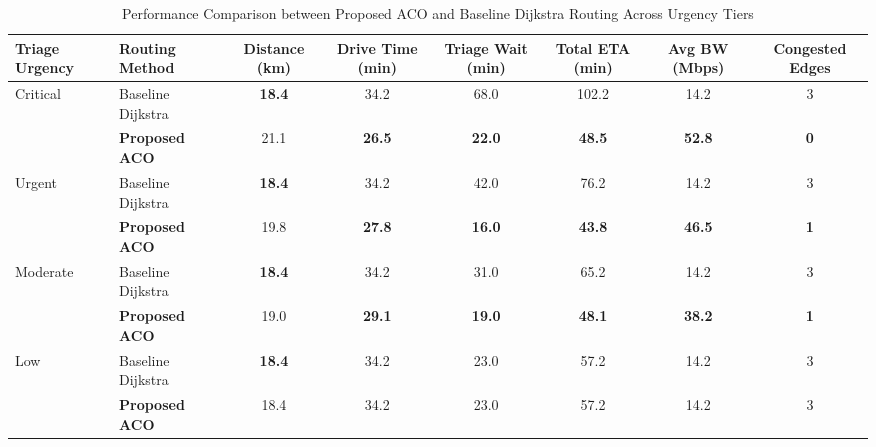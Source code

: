 \documentclass[conference]{IEEEtran}
\begin{document}
\begin{table}[t]
\caption{Performance Comparison between Proposed ACO and Baseline Dijkstra Routing Across Urgency Tiers}
\begin{center}
\begin{tabular}{llcccccc}
\toprule
\textbf{Triage Urgency} & \textbf{Routing Method} & \textbf{Distance (km)} & \textbf{Drive Time (min)} & \textbf{Triage Wait (min)} & \textbf{Total ETA (min)} & \textbf{Avg BW (Mbps)} & \textbf{Congested Edges} \\
\midrule
\multirow{2}{*}{Critical} & Baseline Dijkstra & \textbf{18.4} & 34.2 & 68.0 & 102.2 & 14.2 & 3 \\
                          & \textbf{Proposed ACO} & 21.1 & \textbf{26.5} & \textbf{22.0} & \textbf{48.5} & \textbf{52.8} & \textbf{0} \\
\midrule
\multirow{2}{*}{Urgent}   & Baseline Dijkstra & \textbf{18.4} & 34.2 & 42.0 & 76.2 & 14.2 & 3 \\
                          & \textbf{Proposed ACO} & 19.8 & \textbf{27.8} & \textbf{16.0} & \textbf{43.8} & \textbf{46.5} & \textbf{1} \\
\midrule
\multirow{2}{*}{Moderate} & Baseline Dijkstra & \textbf{18.4} & 34.2 & 31.0 & 65.2 & 14.2 & 3 \\
                          & \textbf{Proposed ACO} & 19.0 & \textbf{29.1} & \textbf{19.0} & \textbf{48.1} & \textbf{38.2} & \textbf{1} \\
\midrule
\multirow{2}{*}{Low}      & Baseline Dijkstra & \textbf{18.4} & 34.2 & 23.0 & 57.2 & 14.2 & 3 \\
                          & \textbf{Proposed ACO} & 18.4 & 34.2 & 23.0 & 57.2 & 14.2 & 3 \\
\bottomrule
\end{tabular}
\label{tab:results}
\end{center}
\end{table}
\end{document}
